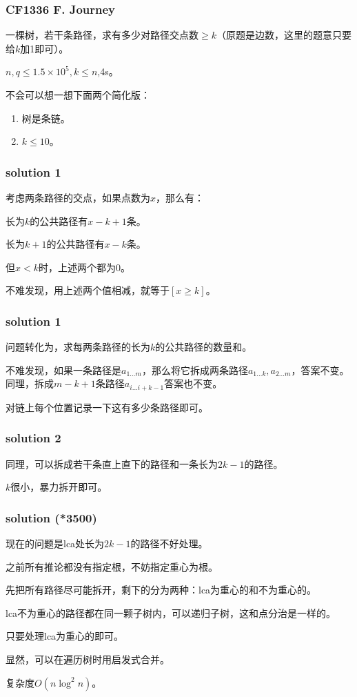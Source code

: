 \documentclass[10pt]{beamer}
\begin{document}
	\clearpage
	\begin{frame}
		\frametitle{CF1336 F. Journey}

		一棵树，若干条路径，求有多少对路径交点数$\ge k$（原题是边数，这里的题意只要给$k$加1即可）。

		$n,q\le 1.5\times 10^5,k\le n$,4s。

		不会可以想一想下面两个简化版：

		\begin{enumerate}
			\item 树是条链。
			\item $k\le 10$。
		\end{enumerate}

	\end{frame}
	\clearpage
	\begin{frame}
		\frametitle{solution 1}
	
		考虑两条路径的交点，如果点数为$x$，那么有：

		长为$k$的公共路径有$x-k+1$条。

		长为$k+1$的公共路径有$x-k$条。

		但$x<k$时，上述两个都为$0$。

		不难发现，用上述两个值相减，就等于$[x\ge k]$。
	
	\end{frame}
	\clearpage
	\begin{frame}
		\frametitle{solution 1}
	
		问题转化为，求每两条路径的长为$k$的公共路径的数量和。
	
		不难发现，如果一条路径是$a_{1\dots m}$，那么将它拆成两条路径$a_{1\dots k},a_{2\dots m}$，答案不变。同理，拆成$m-k+1$条路径$a_{i\dots i+k-1}$答案也不变。

		对链上每个位置记录一下这有多少条路径即可。

	\end{frame}
	\clearpage
	\begin{frame}
		\frametitle{solution 2}
	
		同理，可以拆成若干条直上直下的路径和一条长为$2k-1$的路径。

		$k$很小，暴力拆开即可。
	
	\end{frame}
	\clearpage
	\begin{frame}
		\frametitle{solution (*3500)}
	
		现在的问题是lca处长为$2k-1$的路径不好处理。

		之前所有推论都没有指定根，不妨指定重心为根。

		先把所有路径尽可能拆开，剩下的分为两种：lca为重心的和不为重心的。

		lca不为重心的路径都在同一颗子树内，可以递归子树，这和点分治是一样的。

		只要处理lca为重心的即可。

		显然，可以在遍历树时用启发式合并。

		复杂度$O(n\log^2 n)$。
	
	\end{frame}
\end{document}

